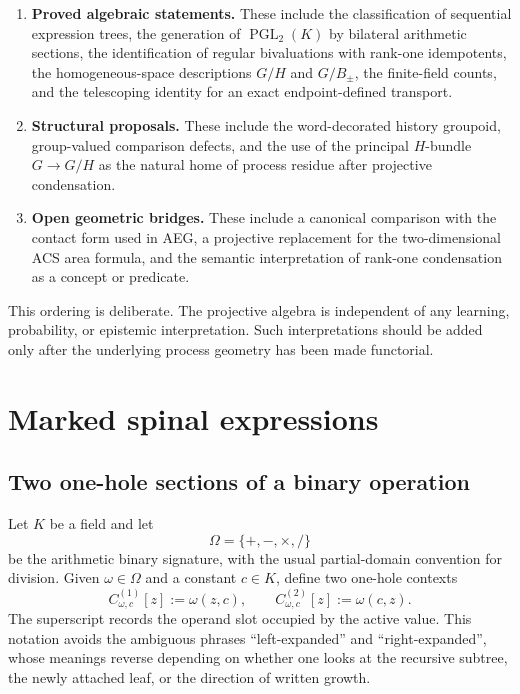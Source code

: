 \documentclass[11pt]{article}
\theoremstyle{definition}
\theoremstyle{remark}
\newcommand{\PGL}{\operatorname{PGL}}
\begin{document}
\begin{enumerate}
  \item \textbf{Proved algebraic statements.}
  These include the classification of sequential expression trees, the
  generation of \(\PGL_2(K)\) by bilateral arithmetic sections, the
  identification of regular bivaluations with rank-one idempotents, the
  homogeneous-space descriptions \(G/H\) and \(G/B_\pm\), the finite-field
  counts, and the telescoping identity for an exact endpoint-defined
  transport.

  \item \textbf{Structural proposals.}
  These include the word-decorated history groupoid, group-valued comparison
  defects, and the use of the principal \(H\)-bundle \(G\to G/H\) as the
  natural home of process residue after projective condensation.

  \item \textbf{Open geometric bridges.}
  These include a canonical comparison with the contact form used in AEG,
  a projective replacement for the two-dimensional ACS area formula, and the
  semantic interpretation of rank-one condensation as a concept or predicate.
\end{enumerate}

This ordering is deliberate.  The projective algebra is independent of any
learning, probability, or epistemic interpretation.  Such interpretations
should be added only after the underlying process geometry has been made
functorial.

\section{Marked spinal expressions}

\subsection{Two one-hole sections of a binary operation}

Let \(K\) be a field and let
\[
\Omega=\{+,-,\times,/\}
\]
be the arithmetic binary signature, with the usual partial-domain convention
for division.  Given \(\omega\in\Omega\) and a constant \(c\in K\), define two
one-hole contexts
\begin{equation}
 C^{(1)}_{\omega,c}[z]:=\omega(z,c),
 \qquad
 C^{(2)}_{\omega,c}[z]:=\omega(c,z).
 \label{eq:two-sections}
\end{equation}
The superscript records the operand slot occupied by the active value.  This
notation avoids the ambiguous phrases ``left-expanded'' and
``right-expanded'', whose meanings reverse depending on whether one looks at
the recursive subtree, the newly attached leaf, or the direction of written
growth.
\end{document}
